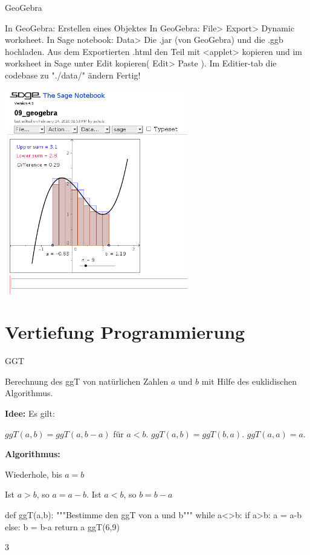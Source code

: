 \documentclass[fontsize=12pt,paper=a4,twoside,bibtotoc,idxtotoc,
liststotoc,pagesize,BCOR1.2cm,DIV15,chapterprefix,pagesize=pdftex]{scrbook}
\theoremstyle{plain}
\theoremstyle{definition}
\theoremstyle{remark}
\begin{document}
GeoGebra


  In GeoGebra: Erstellen eines Objektes
 In GeoGebra: File> Export> Dynamic worksheet.
 In Sage notebook: Data> Die .jar (von GeoGebra) und die .ggb hochladen.
 Aus dem Exportierten .html den Teil mit <applet> kopieren und im worksheet in Sage unter Edit kopieren( Edit> Paste ).
 Im Editier-tab die codebase zu "./data/" ändern
 Fertig!


\begin{center}
\includegraphics[width=0.6\textwidth]{geogebra.png}
\end{center}

\section{Vertiefung Programmierung}

GGT

Berechnung des ggT von natürlichen Zahlen $a$ und $b$ mit Hilfe des
euklidischen Algorithmus.
\bigskip

\textbf{Idee:} Es gilt:

  $ggT(a,b)=ggT(a,b-a)$ für $a<b$.
 $ggT(a,b)=ggT(b,a)$.
 $ggT(a,a)=a$.


\textbf{Algorithmus:}

Wiederhole,  bis $a=b$
 
 Ist $a>b$, so $a=a-b$.
 Ist $a<b$, so $b=b-a$ 


\begin{sagein}
def ggT(a,b):  
    """Bestimme den ggT von a und b"""
    while a<>b:
        if a>b:
            a = a-b
        else: 
            b = b-a
    return a
ggT(6,9)
\end{sagein}
\begin{sage}
3  
\end{sage}
\end{document}
